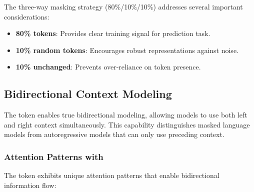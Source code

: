 The three-way masking strategy (80\%/10\%/10\%) addresses several important considerations:

\begin{itemize}
\item \textbf{80\% \mask{} tokens}: Provides clear training signal for prediction task.
\item \textbf{10\% random tokens}: Encourages robust representations against noise.
\item \textbf{10\% unchanged}: Prevents over-reliance on \mask{} token presence.
\end{itemize}

\subsection{Bidirectional Context Modeling}

The \mask{} token enables true bidirectional modeling, allowing models to use both left and right context simultaneously. This capability distinguishes masked language models from autoregressive models that can only use preceding context.

\subsubsection{Attention Patterns with \mask{}}

The \mask{} token exhibits unique attention patterns that enable bidirectional information flow:

